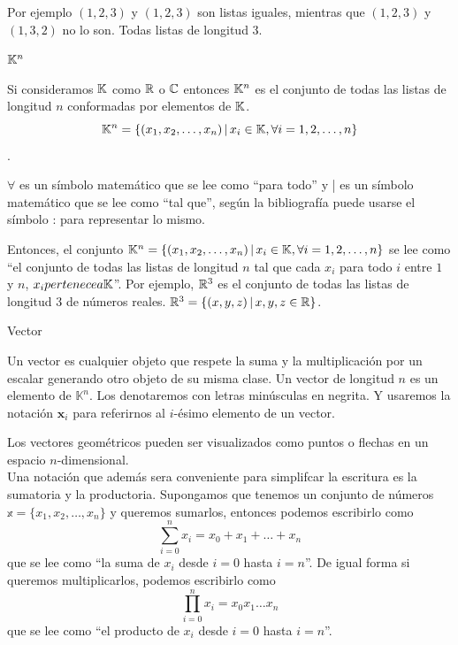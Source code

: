 Por ejemplo $(1, 2, 3)$ y $(1, 2, 3)$ son listas iguales, mientras que $(1, 2, 3)$ y $(1, 3, 2)$ no lo son. Todas listas de longitud 3.

\begin{definition}
    $\mathbb{K}^n$
    
    Si consideramos $\mathbb{K}$ como $\mathbb{R}$ o $\mathbb{C}$ entonces $\mathbb{K}^n$ es el conjunto de todas las listas de longitud $n$ conformadas por elementos de $\mathbb{K}$.
    $$ \mathbb{K}^n = \{(x_1, x_2, \ldots, x_n) \,|\, x_i \in \mathbb{K}, \forall i = 1, 2, \ldots, n\} $$.
\end{definition}

$\forall $ es un símbolo matemático que se lee como ``para todo'' y | es un símbolo matemático que se lee como ``tal que'', según la bibliografía puede usarse el símbolo : para representar lo mismo.

Entonces, el conjunto $ \mathbb{K}^n = \{(x_1, x_2, \ldots, x_n) \,|\, x_i \in \mathbb{K}, \forall i = 1, 2, \ldots, n\}$
se lee como ``el conjunto de todas las listas de longitud $n$ tal que cada $x_i$ para todo $i$ entre $1$ y $n$, $x_i pertenece a \mathbb{K}$''.
Por ejemplo, $\mathbb{R}^3$ es el conjunto de todas las listas de longitud 3 de números reales. $\mathbb{R}^3 = \{(x, y, z) \,|\, x, y, z \in \mathbb{R}\}$.

\begin{definition}
    Vector
    
    Un vector es cualquier objeto que respete la suma y la multiplicación por un escalar generando otro objeto de su misma clase. Un vector de longitud $n$ es un elemento de $\mathbb{K}^n$. Los denotaremos con letras minúsculas en negrita. Y usaremos la notación $\mathbf{x}_i$ para referirnos al $i$-ésimo elemento de un vector.
\end{definition}

Los vectores geométricos pueden ser visualizados como puntos o flechas en un espacio $n$-dimensional.\\
Una notación que además sera conveniente para simplifcar la escritura es la sumatoria y la productoria. Supongamos que tenemos un conjunto de números $\mathbb{x} = \{x_1, x_2, \ldots, x_n\}$ y queremos sumarlos,
entonces podemos escribirlo como $$\sum_{i=0}^{n} x_i = x_0 + x_1 + \ldots + x_n$$ que se lee como ``la suma de $x_i$ desde $i=0$ hasta $i=n$''.
De igual forma si queremos multiplicarlos, podemos escribirlo como $$\prod_{i=0}^{n} x_i = x_0 x_1 \ldots x_n$$ que se lee como ``el producto de $x_i$ desde $i=0$ hasta $i=n$''.


